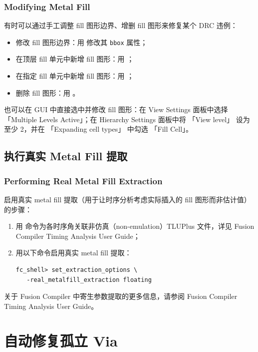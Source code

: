 \subsubsection*{Modifying Metal Fill}

有时可以通过手工调整 fill 图形边界、增删 fill 图形来修复某个 DRC 违例：
\begin{itemize}
  \item 修改 fill 图形边界：用  修改其 \texttt{bbox} 属性；
  \item 在顶层 fill 单元中新增 fill 图形：用 ；
  \item 在指定 fill 单元中新增 fill 图形：用 ；
  \item 删除 fill 图形：用 。
\end{itemize}

也可以在 GUI 中直接选中并修改 fill 图形：在 View Settings 面板中选择 「Multiple Levels Active」；在 Hierarchy Settings 面板中将 「View level」 设为至少 2，并在 「Expanding cell types」 中勾选 「Fill Cell」。

\subsection{执行真实 Metal Fill 提取}
\subsubsection*{Performing Real Metal Fill Extraction}

启用真实 metal fill 提取（用于让时序分析考虑实际插入的 fill 图形而非估计值）的步骤：
\begin{enumerate}
  \item 用  命令为各时序角关联非仿真（non-emulation）TLUPlus 文件，详见 Fusion Compiler Timing Analysis User Guide；
  \item 用以下命令启用真实 metal fill 提取：
\begin{lstlisting}
fc_shell> set_extraction_options \
   -real_metalfill_extraction floating
\end{lstlisting}
\end{enumerate}

关于 Fusion Compiler 中寄生参数提取的更多信息，请参阅 Fusion Compiler Timing Analysis User Guide。

\section{自动修复孤立 Via}
